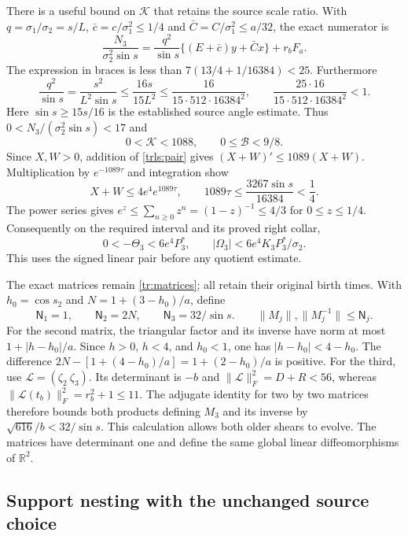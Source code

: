 There is a useful bound on $\mathcal K$ that retains the source
scale ratio. With $q=\sigma_1/\sigma_2=s/L$,
$\bar c=c/\sigma_1^2\leq1/4$ and
$\bar C=C/\sigma_1^2\leq a/32$, the exact numerator is
\[
 \frac{N_3}{\sigma_2^2\sin s}
 =\frac{q^2}{\sin s}\{(E+\bar c)y+\bar Cx\}
       +r_bF_a.
\]
The expression in braces is less than
$7(13/4+1/16384)<25$. Furthermore
\[
 \frac{q^2}{\sin s}=\frac{s^2}{L^2\sin s}
 \leq\frac{16s}{15L^2}
 \leq\frac{16}{15\cdot512\cdot16384^2},
 \qquad
 \frac{25\cdot16}{15\cdot512\cdot16384^2}<1.
\]
Here $\sin s\geq15s/16$ is the established source angle
estimate. Thus $0<N_3/(\sigma_2^2\sin s)<17$ and
\begin{equation}\label{trls:pairbox}
 0<\mathcal K<1088,\qquad 0\leq\mathcal B<9/8.
\end{equation}
Since $X,W>0$, addition of \eqref{trls:pair} gives
$(X+W)'\leq1089(X+W)$. Multiplication by
$e^{-1089\tau}$ and integration show
\[
 X+W\leq4e^4e^{1089\tau},\qquad
 1089\tau\leq\frac{3267\sin s}{16384}<\frac14.
\]
The power series gives $e^z\leq\sum_{n\geq0}z^n
=(1-z)^{-1}\leq4/3$ for $0\leq z\leq1/4$.
Consequently on the required interval and its proved right collar,
\begin{equation}\label{trls:amplitudes}
 0<-\Theta_3<6e^4P_3^*,\qquad
 |\Omega_3|<6e^4K_3P_3^*/\sigma_2.
\end{equation}
This uses the signed linear pair before any quotient estimate.

The exact matrices remain \eqref{tr:matrices}; all retain their
original birth times. With $h_0=\cos s_2$ and
$N=1+(3-h_0)/a$, define
\begin{equation}\label{trls:matrixbounds}
 \mathsf N_1=1,\qquad \mathsf N_2=2N,\qquad
 \mathsf N_3=32/\sin s.
 \qquad
 \|M_j\|,\|M_j^{-1}\|\leq\mathsf N_j.
\end{equation}
For the second matrix, the triangular factor and its inverse have
norm at most $1+|h-h_0|/a$. Since $h>0$, $h<4$, and
$h_0<1$, one has $|h-h_0|<4-h_0$. The difference
$2N-[1+(4-h_0)/a]=1+(2-h_0)/a$ is positive.
For the third, use $\mathcal L=(\zeta_2\ \zeta_3)$.
Its determinant is $-b$ and
$\|\mathcal L\|_F^2=D+R<56$, whereas
$\|\mathcal L(t_b)\|_F^2=r_b^2+1\leq11$.
The adjugate identity for two by two matrices therefore bounds
both products defining $M_3$ and its inverse by
$\sqrt{616}/b<32/\sin s$. This calculation allows both
older shears to evolve. The matrices have determinant one and
define the same global linear diffeomorphisms of $\mathbb R^2$.

\subsection{Support nesting with the unchanged source choice}

